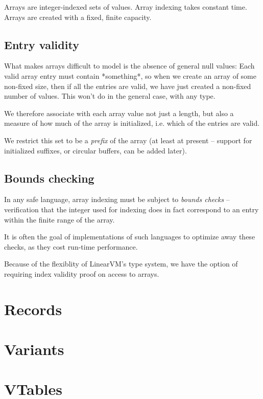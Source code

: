 \documentclass[a4paper]{book}
\begin{document}
Arrays are integer-indexed sets of values.
Array indexing takes constant time.
Arrays are created with a fixed, finite capacity.

\section{Entry validity}

What makes arrays difficult to model is the absence of general null values:
Each valid array entry must contain *something*, so when we create an
array of some non-fixed size, then if all the entries are valid, we
have just created a non-fixed number of values.
This won't do in the general case, with any type.

We therefore associate with each array value not just a length, but
also a measure of how much of the array is initialized, i.e. which of
the entries are valid.

We restrict this set to be a \emph{prefix} of the array (at least at
present -- support for initialized suffixes, or circular buffers, can
be added later).

\section{Bounds checking}
In any safe language, array indexing must be subject to \emph{bounds checks}
-- verification that the integer used for indexing does in fact correspond to
an entry within the finite range of the array.

It is often the goal of implementations of such languages to optimize
away these checks, as they cost run-time performance.

Because of the flexiblity of LinearVM's type system, we have the option
of requiring index validity proof on access to arrays.


\chapter{Records}

\chapter{Variants}
\chapter{VTables}
\end{document}

